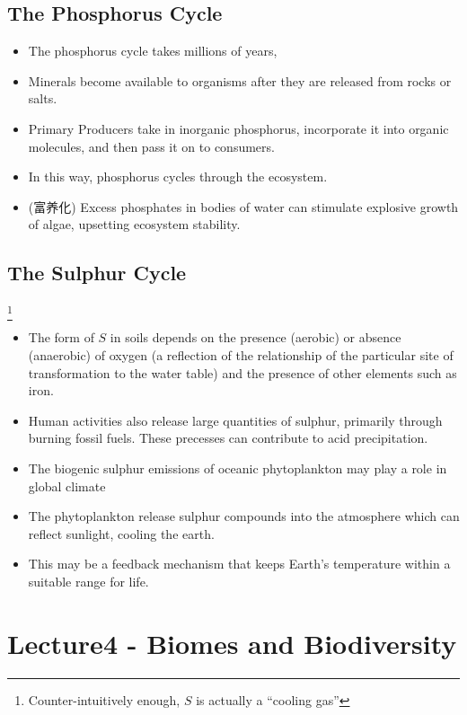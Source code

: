 \documentclass[10pt]{article}
\begin{document}
\subsection{The Phosphorus Cycle}
\begin{itemize}
    \item The phosphorus cycle takes millions of years,
    \item Minerals become available to organisms after they are released from rocks or salts.
    \item Primary Producers take in inorganic phosphorus, incorporate it into organic molecules, and then pass it on to consumers. 
    \item In this way, phosphorus cycles through the ecosystem. 
    \item (富养化) Excess phosphates in bodies of water can stimulate explosive growth of algae, upsetting ecosystem stability.  
\end{itemize}

\subsection{The Sulphur Cycle}\footnote{Counter-intuitively enough, $S$ is actually a ``cooling gas''}
\begin{itemize}
    \item The form of $S$ in soils depends on the presence (aerobic) or absence (anaerobic) of oxygen (a reflection of the relationship of the particular site of transformation to the water table) and the presence of other elements such as iron. 
    \item Human activities also release large quantities of sulphur, primarily through burning fossil fuels. These precesses can contribute to acid precipitation.
    \item The biogenic sulphur emissions of oceanic phytoplankton may play a role in global climate
    \item The phytoplankton release sulphur compounds into the atmosphere which can reflect sunlight, cooling the earth. 
    \item This may be a feedback mechanism that keeps Earth's temperature within a suitable range for life. 
\end{itemize}



\section{Lecture4 - Biomes and Biodiversity}
\end{document}

